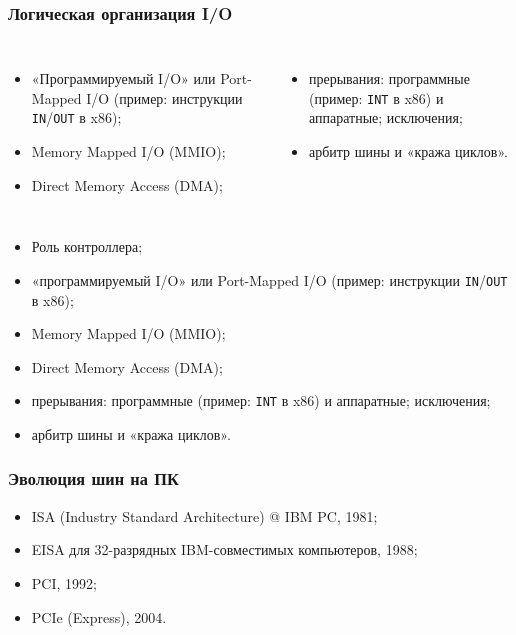 \begin{frame}
\frametitle{Логическая организация I/O}

\pause

\begin{columns}
    \column{6cm}
\begin{itemize}[<+->]
    \item «Программируемый I/O» или Port-Mapped I/O (пример: инструкции \texttt{IN}/\texttt{OUT} в x86);
    \item Memory Mapped I/O (MMIO);
    \item Direct Memory Access (DMA);
\end{itemize}

    \column{6.5cm}
\begin{itemize}[<+->]
    \item прерывания: программные (пример: \texttt{INT} в x86) и аппаратные; исключения;
    \item арбитр шины и «кража циклов».
\end{itemize}
\end{columns}

\begin{itemize}[<+->]
    \item Роль контроллера;
    \item «программируемый I/O» или Port-Mapped I/O (пример: инструкции \texttt{IN}/\texttt{OUT} в x86);
    \item Memory Mapped I/O (MMIO);
    \item Direct Memory Access (DMA);
    \item прерывания: программные (пример: \texttt{INT} в x86) и аппаратные; исключения;
    \item арбитр шины и «кража циклов».
\end{itemize}
\end{frame}

\begin{frame}
\frametitle{Эволюция шин на ПК}
\begin{itemize}
    \item ISA (Industry Standard Architecture) @ IBM PC, 1981;
    \item EISA для 32-разрядных IBM-совместимых компьютеров, 1988;
    \item PCI, 1992;
    \item PCIe (Express), 2004.
\end{itemize}
\end{frame}

